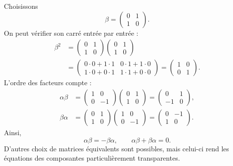 Choisissons
\begin{equation}
\beta=
\begin{pmatrix}
0&1\\
1&0
\end{pmatrix}.
\end{equation}
On peut vérifier son carré entrée par entrée :
\begin{equation}
\begin{aligned}
\beta^2
&=
\begin{pmatrix}
0&1\\
1&0
\end{pmatrix}
\begin{pmatrix}
0&1\\
1&0
\end{pmatrix}\\
&=
\begin{pmatrix}
0\cdot0+1\cdot1&0\cdot1+1\cdot0\\
1\cdot0+0\cdot1&1\cdot1+0\cdot0
\end{pmatrix}
=
\begin{pmatrix}
1&0\\
0&1
\end{pmatrix}.
\end{aligned}
\end{equation}
L’ordre des facteurs compte :
\begin{align}
\alpha\beta
&=
\begin{pmatrix}
1&0\\
0&-1
\end{pmatrix}
\begin{pmatrix}
0&1\\
1&0
\end{pmatrix}
=
\begin{pmatrix}
0&1\\
-1&0
\end{pmatrix},\\
\beta\alpha
&=
\begin{pmatrix}
0&1\\
1&0
\end{pmatrix}
\begin{pmatrix}
1&0\\
0&-1
\end{pmatrix}
=
\begin{pmatrix}
0&-1\\
1&0
\end{pmatrix}.
\end{align}
Ainsi,
\begin{equation}
\alpha\beta=-\beta\alpha,
\qquad
\alpha\beta+\beta\alpha=0.
\end{equation}
D’autres choix de matrices équivalents sont possibles, mais celui-ci rend les équations des composantes particulièrement transparentes.

